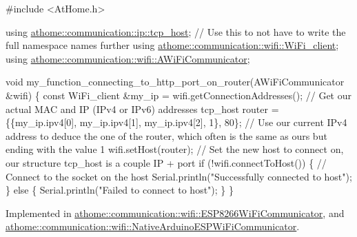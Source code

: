 \begin{DoxyCode}
\textcolor{preprocessor}{#include <AtHome.h>}

\textcolor{keyword}{using} \mbox{\hyperlink{structathome_1_1communication_1_1ip_1_1s__host}{athome::communication::ip::tcp\_host}}; \textcolor{comment}{// Use this to not have to
       write the full namespace names further}
\textcolor{keyword}{using} \mbox{\hyperlink{structathome_1_1communication_1_1wifi_1_1s__wifi__client}{athome::communication::wifi::WiFi\_client}};
\textcolor{keyword}{using} \mbox{\hyperlink{classathome_1_1communication_1_1wifi_1_1_a_wi_fi_communicator}{athome::communication::wifi::AWiFiCommunicator}};

\textcolor{keywordtype}{void} my\_function\_connecting\_to\_http\_port\_on\_router(AWiFiCommunicator &wifi) \{
  \textcolor{keyword}{const} WiFi\_client &my\_ip = wifi.getConnectionAddresses(); \textcolor{comment}{// Get our actual MAC and IP (IPv4 or IPv6)
       addresses}
  tcp\_host router = \{\{my\_ip.ipv4[0], my\_ip.ipv4[1], my\_ip.ipv4[2], 1\}, 80\}; \textcolor{comment}{// Use our current IPv4 address
       to deduce the one of the router, which often is the same as ours but ending with the value 1}
  wifi.setHost(router); \textcolor{comment}{// Set the new host to connect on, our structure tcp\_host is a couple IP + port}
  \textcolor{keywordflow}{if} (!wifi.connectToHost()) \{ \textcolor{comment}{// Connect to the socket on the host}
    Serial.println(\textcolor{stringliteral}{"Successfully connected to host"});
  \} \textcolor{keywordflow}{else} \{
    Serial.println(\textcolor{stringliteral}{"Failed to connect to host"});
  \}
\}
\end{DoxyCode}
 

Implemented in \mbox{\hyperlink{classathome_1_1communication_1_1wifi_1_1_e_s_p8266_wi_fi_communicator_a159a93b350df135daa967665c9e53e2f}{athome\+::communication\+::wifi\+::\+E\+S\+P8266\+Wi\+Fi\+Communicator}}, and \mbox{\hyperlink{classathome_1_1communication_1_1wifi_1_1_native_arduino_e_s_p_wi_fi_communicator_ab3f6a0e1b9d3be98a876f95dde97976b}{athome\+::communication\+::wifi\+::\+Native\+Arduino\+E\+S\+P\+Wi\+Fi\+Communicator}}.

\mbox{\label{classathome_1_1communication_1_1_a_network_communicator_a025b7fbe9b3c4452fcf1925d766324eb}} 
